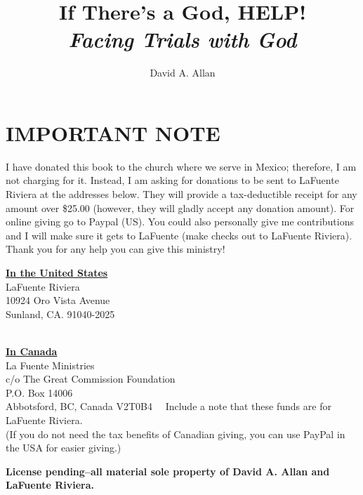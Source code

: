 \documentclass[oneside,12pt]{book}
\begin{document}
%

\frontmatter
\title{\fontsize{72}{86.4}\selectfont If There's a God, HELP!\\
	\textit{\fontsize{24}{28.8}\selectfont Facing Trials with God}
}
\author{\fontsize{24}{28.8}\selectfont David A. Allan}
\maketitle
\chapter{IMPORTANT NOTE}
I have donated this book to the church where we serve in Mexico; therefore, I am not charging for it. Instead, I am asking for donations to be sent to LaFuente Riviera at the addresses below. They will provide a tax-deductible receipt for any amount over \$25.00 (however, they will gladly accept any donation amount). For online giving go to Paypal (US). You could also personally give me contributions and I will make sure it gets to LaFuente (make checks out to LaFuente Riviera). Thank you for any help you can give this ministry!\\

\begin{center}
\underline{\textbf{In the United States}}\\
LaFuente Riviera\\
10924 Oro Vista Avenue\\
Sunland, CA. 91040-2025\\
\
\

\underline{\textbf{In Canada}}\\
La Fuente Ministries\\
c/o The Great Commission Foundation\\
P.O. Box 14006\\
Abbotsford, BC, Canada V2T0B4
\
\
Include a note that these funds are for LaFuente Riviera.\\
(If you do not need the tax benefits of Canadian giving, you can use PayPal in the USA for easier giving.)
\end{center}
\textbf{License pending--all material sole property of David A. Allan and LaFuente Riviera.}
\end{document}
